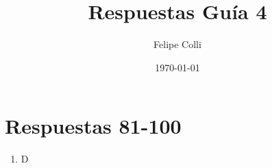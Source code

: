\documentclass[11pt]{article}
\title{Respuestas Guía 4}
\author{Felipe Colli}
\date{\today}
\begin{document}
\maketitle

\section{Respuestas 81-100}
\begin{enumerate}
    \item D %
\end{enumerate}

\end{document}
